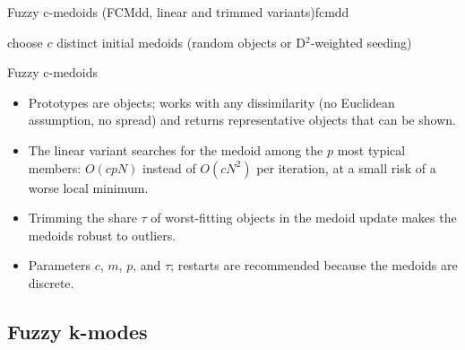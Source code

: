 \begin{algobox}{Fuzzy c-medoids (FCMdd, linear and trimmed variants)}{fcmdd}
\begin{algorithm}[H]
choose $c$ distinct initial medoids (random objects or D$^2$-weighted seeding)\;
\end{algorithm}
\end{algobox}
\begin{summarybox}{Fuzzy c-medoids}
\begin{itemize}
  \item Prototypes are objects; works with any dissimilarity (no Euclidean assumption, no spread) and returns representative objects that can be shown.
  \item The linear variant searches for the medoid among the $p$ most typical members: $O(cpN)$ instead of $O(cN^2)$ per iteration, at a small risk of a worse local minimum.
  \item Trimming the share $\tau$ of worst-fitting objects in the medoid update makes the medoids robust to outliers.
  \item Parameters $c$, $m$, $p$, and $\tau$; restarts are recommended because the medoids are discrete.
\end{itemize}
\end{summarybox}

\subsection{Fuzzy k-modes}\label{sec:rel:kmodes}

